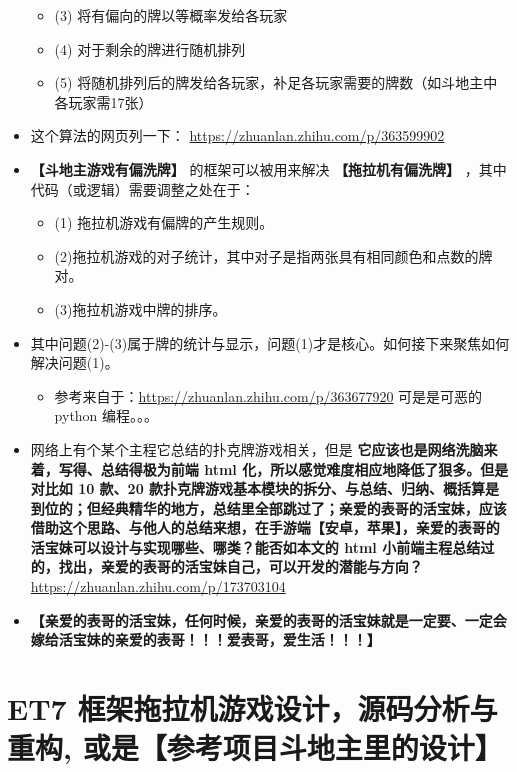 \documentclass[9pt, b5paper]{article}
\begin{document}
\begin{itemize}
\begin{itemize}
\item (3) 将有偏向的牌以等概率发给各玩家
\item (4) 对于剩余的牌进行随机排列
\item (5) 将随机排列后的牌发给各玩家，补足各玩家需要的牌数（如斗地主中各玩家需17张）
\end{itemize}
\item 这个算法的网页列一下： \url{https://zhuanlan.zhihu.com/p/363599902}
\item \textbf{【斗地主游戏有偏洗牌】} 的框架可以被用来解决 \textbf{【拖拉机有偏洗牌】} ，其中代码（或逻辑）需要调整之处在于：
\begin{itemize}
\item (1) 拖拉机游戏有偏牌的产生规则。
\item (2)拖拉机游戏的对子统计，其中对子是指两张具有相同颜色和点数的牌对。
\item (3)拖拉机游戏中牌的排序。
\end{itemize}
\item 其中问题(2)-(3)属于牌的统计与显示，问题(1)才是核心。如何接下来聚焦如何解决问题(1)。
\begin{itemize}
\item 参考来自于：\url{https://zhuanlan.zhihu.com/p/363677920} 可是是可恶的 python 编程。。。
\end{itemize}
\item 网络上有个某个主程它总结的扑克牌游戏相关，但是 \textbf{它应该也是网络洗脑来着，写得、总结得极为前端 html 化，所以感觉难度相应地降低了狠多。但是对比如 10 款、20 款扑克牌游戏基本模块的拆分、与总结、归纳、概括算是到位的；但经典精华的地方，总结里全部跳过了；亲爱的表哥的活宝妹，应该借助这个思路、与他人的总结来想，在手游端【安卓，苹果】，亲爱的表哥的活宝妹可以设计与实现哪些、哪类？能否如本文的 html 小前端主程总结过的，找出，亲爱的表哥的活宝妹自己，可以开发的潜能与方向？} \url{https://zhuanlan.zhihu.com/p/173703104}
\item \textbf{【亲爱的表哥的活宝妹，任何时候，亲爱的表哥的活宝妹就是一定要、一定会嫁给活宝妹的亲爱的表哥！！！爱表哥，爱生活！！！】}
\end{itemize}
\section{ET7 框架拖拉机游戏设计，源码分析与重构, 或是【参考项目斗地主里的设计】}
\label{sec-3}
\end{document}
